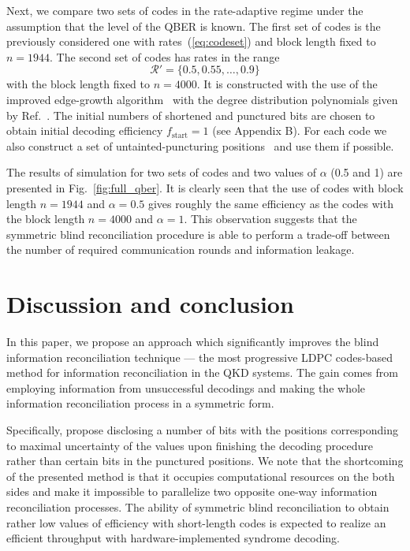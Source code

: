 \documentclass[aps,pra,twocolumn,amsmath,amssymb,nofootinbib,showpacs,superscriptaddress]{revtex4-1}
\newcommand{\fst}{f_{\mathrm{start}}}
\begin{document}
Next, we compare two sets of codes in the rate-adaptive regime under the assumption that the level of the QBER is known.
The first set of codes is the previously considered one with rates~(\ref{eq:codeset}) and block length fixed to $n=1944$.
The second set of codes has rates in the range
\begin{equation}\label{eq:codeset2}
	\mathcal{R}'=\{0.5,0.55,\ldots,0.9\}
\end{equation} 
with the block length fixed to $n{=}4000$.
It is constructed with the use of the improved edge-growth algorithm~\cite{IPEG} with the degree distribution polynomials given by Ref.~\cite{LDPC2_poly}.
The initial numbers of shortened and punctured bits are chosen to obtain initial decoding efficiency $\fst=1$ (see Appendix B).
For each code we also construct a set of untainted-puncturing positions~\cite{UntP} and use them if possible.

The results of simulation for two sets of codes and two values of $\alpha$ (0.5 and 1) are presented in Fig.~\ref{fig:full_qber}.
It is clearly seen that the use of codes with block length $n=1944$ and $\alpha=0.5$ gives roughly the same efficiency as the codes with the block length $n=4000$ and $\alpha=1$.
This observation suggests that the symmetric blind reconciliation procedure is able to perform a trade-off between the number of required communication rounds and information leakage.

\section{Discussion and conclusion}\label{sec:conclusion}

In this paper, we propose an approach which significantly improves the blind information reconciliation technique --- 
the most progressive LDPC codes-based method for information reconciliation in the QKD systems. 
The gain comes from employing information from unsuccessful decodings and making the whole information reconciliation process in a symmetric form.

Specifically, propose disclosing a number of bits with the positions corresponding to maximal uncertainty of the values upon finishing the decoding procedure rather than certain bits in the punctured positions.
We note that the shortcoming of the presented method is that it occupies computational resources on the both sides 
and make it impossible to parallelize two opposite one-way information reconciliation processes. 
The ability of symmetric blind reconciliation to obtain rather low values of efficiency with short-length codes 
is expected to realize an efficient throughput with hardware-implemented syndrome decoding.
\end{document}

